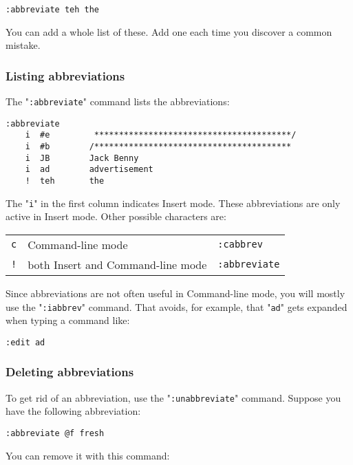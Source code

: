 \begin{Verbatim}[samepage=true]
 :abbreviate teh the
\end{Verbatim}

You can add a whole list of these.
Add one each time you discover a common mistake.
\subsubsection{Listing abbreviations}
The "\verb!:abbreviate!" command lists the abbreviations:

\begin{Verbatim}[samepage=true]
    :abbreviate
    i  #e         ****************************************/
    i  #b        /****************************************
    i  JB        Jack Benny
    i  ad        advertisement
    !  teh       the
\end{Verbatim}

The "\verb!i!" in the first column indicates Insert mode.
These abbreviations are only active in Insert mode.
Other possible characters are:

\begin{center} \begin{tabular}{c l l}
				\verb!c! & Command-line mode & \verb!:cabbrev!\\
				\verb;!; & both Insert and Command-line mode & \verb!:abbreviate!\\
\end{tabular} \end{center}

Since abbreviations are not often useful in Command-line mode, you will mostly use the "\verb!:iabbrev!" command.
That avoids, for example, that "\verb!ad!" gets expanded when typing a command like:

\begin{Verbatim}[samepage=true]
 :edit ad
\end{Verbatim}
\subsubsection{Deleting abbreviations}
To get rid of an abbreviation, use the "\verb!:unabbreviate!" command.
Suppose you have the following abbreviation:

\begin{Verbatim}[samepage=true]
 :abbreviate @f fresh
\end{Verbatim}

You can remove it with this command:

